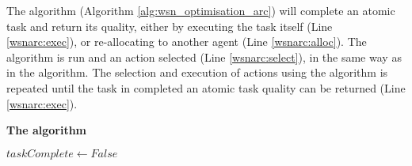The \acronymWSNOptimisationArc{}{} algorithm (Algorithm \ref{alg:wsn_optimisation_arc}) will complete an atomic task and return its quality, either by executing the task itself (Line \ref{wsnarc:exec}), or re-allocating to another agent (Line \ref{wsnarc:alloc}). The \acronymATARIA{}{} algorithm is run and an action selected (Line \ref{wsnarc:select}), in the same way as in the \acronymWSNOptimisationSink{}{} algorithm. The selection and execution of actions using the \acronymATARIA{}{} algorithm is repeated until the task in completed an atomic task quality can be returned (Line \ref{wsnarc:exec}).
\begin{algorithm}[ht]
	\DontPrintSemicolon
	\footnotesize
	
	\caption{\textbf{The \acronymWSNOptimisationArc{}{} algorithm } }
	\label{alg:wsn_optimisation_arc}
	{
		\nonl \;
		
		$taskComplete \leftarrow False$ \;
	\Return{$\functionAtomicTaskQualitySignature{}{}$\label{wsnarc:return}} \;
	}
\end{algorithm}